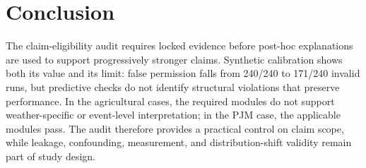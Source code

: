 \documentclass[conference]{IEEEtran}
\begin{document}
\section{Conclusion}
The claim-eligibility audit requires locked evidence before post-hoc explanations
are used to support progressively stronger claims. Synthetic calibration shows
both its value and its limit: false permission falls from 240/240 to 171/240
invalid runs, but predictive checks do not identify structural violations that
preserve performance. In the agricultural cases, the required modules do not
support weather-specific or event-level interpretation; in the PJM case, the
applicable modules pass. The audit therefore provides a practical control on
claim scope, while leakage, confounding, measurement, and distribution-shift
validity remain part of study design.



\end{document}
